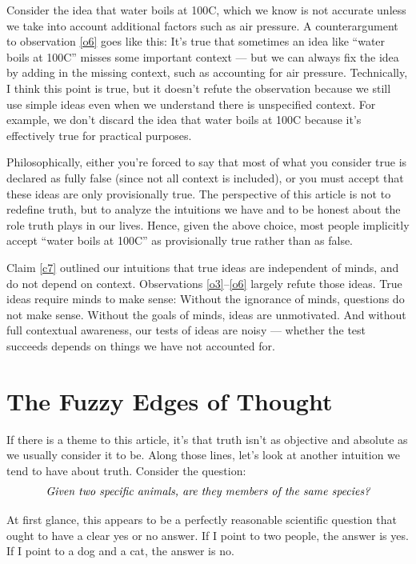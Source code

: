 \documentclass[11pt, oneside]{article}   	%
\begin{document}
Consider the idea that water boils at
100\degree C, which we know is not accurate unless we take into account
additional factors such as air pressure.
A counterargument to observation \ref{o6} goes like this:
It's true that sometimes an idea like ``water boils at 100\degree C'' misses
some important context --- but we can always fix the idea by adding in the
missing context, such as accounting for air pressure.
Technically, I think this point is true, but
it doesn't refute the observation because we still use simple
ideas even when we understand there is unspecified context.
For example, we don't discard the idea that water boils at 100\degree C because
it's effectively true for practical purposes.

Philosophically, either you're
forced to say that
most of what you consider true is declared as fully false (since not
all context is included), or you must accept that these ideas are only
provisionally true.
The perspective of this article is not to redefine truth, but to analyze the
intuitions we have and to be honest about the role truth plays in our lives.
Hence, given the above choice, most people
implicitly accept
``water boils at 100\degree C'' as
provisionally true rather than as false.

Claim \ref{c7} outlined our intuitions that true ideas are independent
of minds, and do not depend on context.
Observations \ref{o3}--\ref{o6} largely refute those ideas.
True ideas require minds to make sense:
Without the ignorance of minds, questions do not make sense.
Without the goals of minds, ideas are unmotivated.
And without full contextual awareness, our tests of ideas are noisy ---
whether the test succeeds depends on things we have not accounted
for.

\section{The Fuzzy Edges of Thought}

If there is a theme to this article, it's that truth isn't as
objective and absolute as we usually consider it to be.
Along those lines, let's
look at another intuition we tend to have about truth.
Consider the question:
\begin{equation*}\label{eq4}
    \text{\em Given two specific animals, are they members of the same
    species?}
\end{equation*}

At first glance, this appears to be a perfectly reasonable scientific question
that ought to have a clear yes or no answer. If I point to two people, the
answer is yes. If I point to a dog and a cat, the answer is no.
\end{document}
